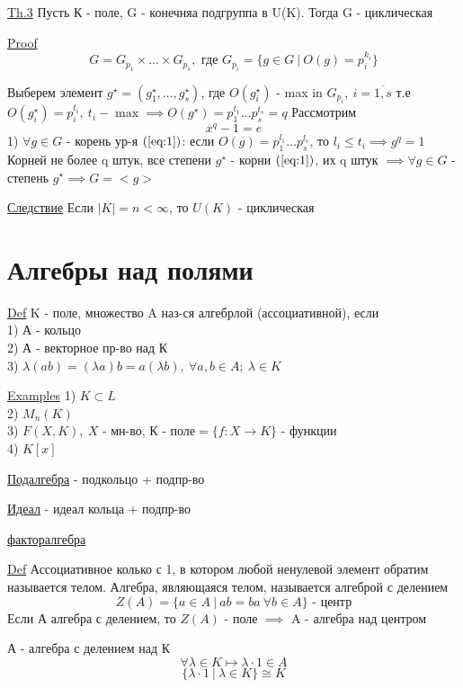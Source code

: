 \documentclass[a4paper]{article}
\begin{document}
\begin{tcolorbox}
\underline{Th.3} Пусть К - поле, G - конечняа подгруппа в U(K). Тогда G - циклическая

\underline{Proof}
\[
    G = G_{p_1} \times \dots \times G_{p_s}, \text{ где } G_{p_i} = \{ g \in G 
    \ | \ O(g) = p_i^{k_i} \}
\]

Выберем элемент $ g^{\star} = (g_1^{\star}, \dots, g_s^{\star}) $, где $ O(g_i^{\star}) $ -
max in $ G_{p_i}, \ i = \overline{1, s}$ т.е $ O(g_i^{\star}) = p_i^{t_i}, \ t_i - \max
\implies O(g^{\star}) = p_1^{t_1} \dots p_s^{t_s} = q$ 
Рассмотрим
\begin{equation}
    x^{q} - 1 = e
    \label{eq:1}
\end{equation}
1) $ \forall g \in G $ - корень ур-я $ (\ref{eq:1}) $: если $ O(g) = p_1^{l_1}
\dots p_s^{l_s}$, то $ l_i \leq t_i \implies g^{q} = 1 $\\
Корней не более q штук, все степени $ g^{\star} $ - корни $ (\ref{eq:1}) $,
их q штук $ \implies \forall g \in G $ - степень $ g^{\star} \implies G = <g> $ 

\underline{Следствие} Если $ |K| = n < \infty $, то $ U(K) $ - циклическая
\end{tcolorbox}

\section*{\centering Алгебры над полями}
\begin{tcolorbox}
\underline{Def} K - поле, множество A наз-ся алгебрлой (ассоциативной), если\\
1) А - кольцо\\
2) А - векторное пр-во над К\\
3) $ \lambda(ab) = (\lambda a)b = a(\lambda b),\ \forall a,b \in A; \ \lambda \in K $ 
\end{tcolorbox}

\underline{Examples} 1) $ K \subset L $ \\
2) $ M_n(K) $\\
3) $ F(X,K), \ X \text{ - мн-во, К - поле} = \{ f: X \to K \}  $ - функции\\
4) $K[x]$

\underline{Подалгебра} - подкольцо + подпр-во

\underline{Идеал} - идеал кольца + подпр-во

\underline{факторалгебра}

\begin{tcolorbox}
\underline{Def} Ассоциативное колько с 1, в котором любой ненулевой элемент обратим
называется телом. Алгебра, являющаяся телом, называется алгеброй с делением 
\[
    Z(A) = \{ a \in A \ | \ ab=ba \ \forall b \in A \} \text{ - центр}
\]
Если А алгебра с делением, то $ Z(A) $ - поле $ \implies $ A - алгебра над центром

А - алгебра с делением над К
\[
    \forall \lambda \in K \mapsto \lambda \cdot 1 \in A
\]
\[
    \{ \lambda \cdot 1 \ | \ \lambda \in K \} \cong K
\]
\end{tcolorbox}
\end{document}
